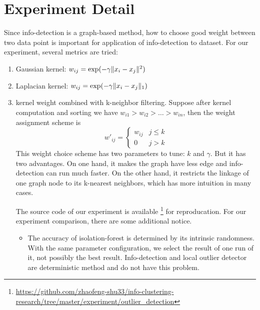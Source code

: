 \documentclass[runningheads]{llncs}
\begin{document}
\section{Experiment Detail}
Since info-detection is a graph-based method, how to choose good weight between two data point is important for application of info-detection to dataset. For our experiment, several metrics are tried: 
\begin{enumerate}
\item Gaussian kernel: $w_{ij} = \exp(-\gamma \lVert x_i - x_j\rVert^2)$
\item Laplacian kernel: $w_{ij} = \exp(-\gamma \lVert x_i - x_j\rVert_1)$
\item kernel weight combined with k-neighbor filtering. Suppose after kernel computation and sorting we have $w_{i1} > w_{i2} > \dots > w_{in}$, then the weight assignment scheme is
$$
w'_{ij}  = 
\begin{cases}
 w_{ij} & j \leq k \\
 0 & j > k
\end{cases}
$$
This weight choice scheme has two parameters to tune: $k$ and $\gamma$. But it has two advantages. On one hand, it makes the graph have less edge and info-detection can run much faster. On the other hand, it restricts the linkage of one graph node to its k-nearest neighbors, which has more intuition in many cases.

The source code of our experiment is available \footnote{\scriptsize\url{https://github.com/zhaofeng-shu33/info-clustering-research/tree/master/experiment/outlier\_detection}} for reproducation.
For our experiment comparison, there are some additional notice.
\begin{itemize}
\item The accuracy of isolation-forest is determined by its intrinsic randomness. With the same parameter configuration, we select the result of one run of it, not possibly the best result. Info-detection and local outlier detector are deterministic method and do not have this problem.
\end{itemize}

\end{enumerate} 
\end{document}
